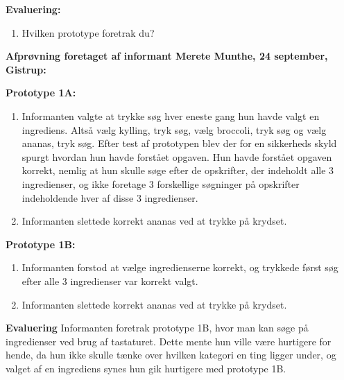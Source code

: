 \textbf{Evaluering:}
\begin{enumerate}[noitemsep]
\item Hvilken prototype foretrak du? 
\end{enumerate}

\textbf{Afprøvning foretaget af informant Merete Munthe, 24 september, Gistrup:}

\textbf{Prototype 1A:}
\begin{enumerate}[noitemsep]
\item Informanten valgte at trykke søg hver eneste gang hun havde valgt en ingrediens. Altså vælg kylling, tryk søg, vælg broccoli, tryk søg og vælg ananas, tryk søg. Efter test af prototypen blev der for en sikkerheds skyld spurgt hvordan hun havde forstået opgaven. Hun havde forstået opgaven korrekt, nemlig at hun skulle søge efter de opskrifter, der indeholdt alle 3 ingredienser, og ikke foretage 3 forskellige søgninger på opskrifter indeholdende hver af disse 3 ingredienser.
\item Informanten slettede korrekt ananas ved at trykke på krydset.
\end{enumerate}

\textbf{Prototype 1B:}
\begin{enumerate}[noitemsep]
\item Informanten forstod at vælge ingredienserne korrekt, og trykkede først søg efter alle 3 ingredienser var korrekt valgt.
\item Informanten slettede korrekt ananas ved at trykke på krydset.
\end{enumerate}

\textbf{Evaluering}
Informanten foretrak prototype 1B, hvor man kan søge på ingredienser ved brug af tastaturet. Dette mente hun ville være hurtigere for hende, da hun ikke skulle tænke over hvilken kategori en ting ligger under, og valget af en ingrediens synes hun gik hurtigere med prototype 1B.